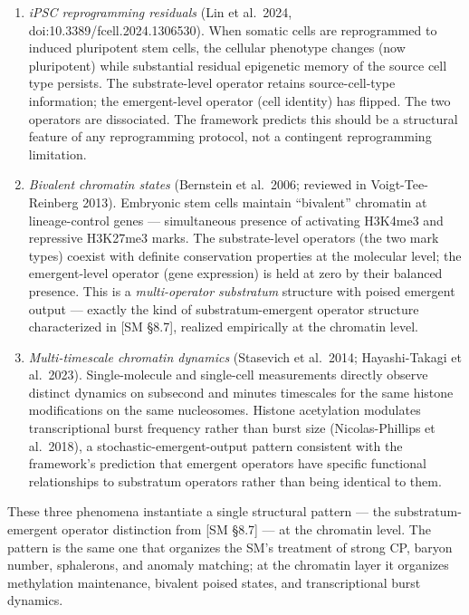 \documentclass[
]{article}
\begin{document}
\begin{enumerate}
\def\labelenumi{(\roman{enumi})}
\item
  \emph{iPSC reprogramming residuals} (Lin et al.~2024,
  doi:10.3389/fcell.2024.1306530). When somatic cells are reprogrammed
  to induced pluripotent stem cells, the cellular phenotype changes (now
  pluripotent) while substantial residual epigenetic memory of the
  source cell type persists. The substrate-level operator retains
  source-cell-type information; the emergent-level operator (cell
  identity) has flipped. The two operators are dissociated. The
  framework predicts this should be a structural feature of any
  reprogramming protocol, not a contingent reprogramming limitation.
\item
  \emph{Bivalent chromatin states} (Bernstein et al.~2006; reviewed in
  Voigt-Tee-Reinberg 2013). Embryonic stem cells maintain ``bivalent''
  chromatin at lineage-control genes --- simultaneous presence of
  activating H3K4me3 and repressive H3K27me3 marks. The substrate-level
  operators (the two mark types) coexist with definite conservation
  properties at the molecular level; the emergent-level operator (gene
  expression) is held at zero by their balanced presence. This is a
  \emph{multi-operator substratum} structure with poised emergent output
  --- exactly the kind of substratum-emergent operator structure
  characterized in {[}SM §8.7{]}, realized empirically at the chromatin
  level.
\item
  \emph{Multi-timescale chromatin dynamics} (Stasevich et al.~2014;
  Hayashi-Takagi et al.~2023). Single-molecule and single-cell
  measurements directly observe distinct dynamics on subsecond and
  minutes timescales for the same histone modifications on the same
  nucleosomes. Histone acetylation modulates transcriptional burst
  frequency rather than burst size (Nicolas-Phillips et al.~2018), a
  stochastic-emergent-output pattern consistent with the framework's
  prediction that emergent operators have specific functional
  relationships to substratum operators rather than being identical to
  them.
\end{enumerate}

These three phenomena instantiate a single structural pattern --- the
substratum-emergent operator distinction from {[}SM §8.7{]} --- at the
chromatin level. The pattern is the same one that organizes the SM's
treatment of strong CP, baryon number, sphalerons, and anomaly matching;
at the chromatin layer it organizes methylation maintenance, bivalent
poised states, and transcriptional burst dynamics.
\end{document}
